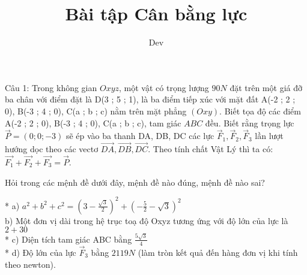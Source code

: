 \documentclass[a4paper,12pt]{article}
\begin{document}
\title{Bài tập Cân bằng lực}
\author{Dev}
\maketitle
Câu 1: Trong không gian \(Oxyz\), một vật có trọng lượng \(90N\) đặt trên một giá đỡ ba chân với điểm đặt là D(3 ; 5 ; 1), là ba điểm tiếp xúc với mặt đất A(-2 ; 2 ; 0), B(-3 ; 4 ; 0), C(a ; b ; c) nằm trên mặt phẳng \((O x y )\). Biết tọa độ các điểm A(-2 ; 2 ; 0), B(-3 ; 4 ; 0), C(a ; b ; c), tam giác \(ABC\) đều. Biết rằng trọng lực \(\overrightarrow{P}=(0 ; 0 ; -3)\) sẽ ép vào ba thanh DA, DB, DC các lực \(\overrightarrow{F}_1, \overrightarrow{F}_2, \overrightarrow{F}_3\) lần lượt hướng dọc theo các vectơ \(\overrightarrow{DA}, \overrightarrow{DB}, \overrightarrow{DC}\). Theo tính chất Vật Lý thì ta có: \(\overrightarrow{F_1}+\overrightarrow{F_2}+\overrightarrow{F_3}=\overrightarrow{P}\).

Hỏi trong các mệnh đề dưới đây, mệnh đề nào đúng, mệnh đề nào sai?

\begin{center}
\end{center}

* a) \(a^2+b^2+c^2=\left(3 - \frac{\sqrt{3}}{2}\right)^{2} + \left(- \frac{5}{2} - \sqrt{3}\right)^{2}\)\\
b) Một đơn vị dài trong hệ trục toạ độ Oxyz tương ứng với độ lớn của lực là \( 2 + 30 \)\\
* c) Diện tích tam giác ABC bằng \( \frac{5 \sqrt{3}}{4} \)\\
* d) Độ lớn của lực \(\overrightarrow{F}_3\) bằng \( 2119 N \) (làm tròn kết quả đến hàng đơn vị khi tính theo newton).
\end{document}
